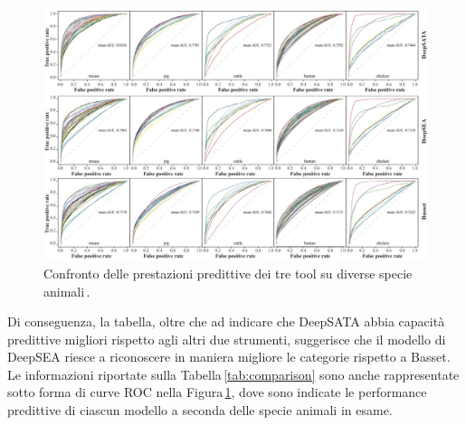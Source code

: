 \begin{figure}[!b]
    \centering
    \includegraphics[width=1\textwidth]{assets/imgs/comparison.jpg}
    \caption[Confronto delle prestazioni predittive dei tre tool su diverse specie animali.]{Confronto delle prestazioni predittive dei tre tool su diverse specie animali\,\cite{ma2023deepsata}.}\label{fig:comparison}
\end{figure}
% 
Di conseguenza, la tabella, oltre che ad indicare che DeepSATA abbia capacità predittive migliori rispetto agli altri due strumenti, suggerisce che il modello di DeepSEA riesce a riconoscere in maniera migliore le categorie rispetto a Basset. Le informazioni riportate sulla Tabella\,\ref{tab:comparison} sono anche rappresentate sotto forma di curve \acs{ROC} nella Figura\,\ref{fig:comparison}, dove sono indicate le performance predittive di ciascun modello a seconda delle specie animali in esame.

